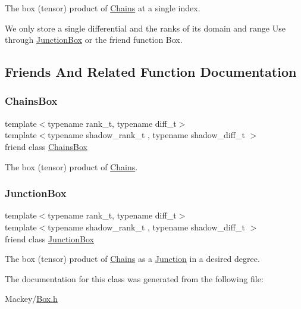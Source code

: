The box (tensor) product of \hyperlink{classMackey_1_1Chains}{Chains} at a single index. 

We only store a single differential and the ranks of its domain and range Use through \hyperlink{classMackey_1_1JunctionBox}{Junction\+Box} or the friend function Box. 

\subsection{Friends And Related Function Documentation}
\mbox{\label{classMackey_1_1BoxPoint_ac5da7907baad1a7469bb064b08228610}} 
\subsubsection{\texorpdfstring{Chains\+Box}{ChainsBox}}
{\footnotesize\ttfamily template$<$typename rank\+\_\+t, typename diff\+\_\+t$>$ \\
template$<$typename shadow\+\_\+rank\+\_\+t , typename shadow\+\_\+diff\+\_\+t $>$ \\
friend class \hyperlink{classMackey_1_1ChainsBox}{Chains\+Box}\hspace{0.3cm}{\ttfamily [friend]}}



The box (tensor) product of \hyperlink{classMackey_1_1Chains}{Chains}. 

\mbox{\label{classMackey_1_1BoxPoint_aa6b9506519f57502db8432843a492fd1}} 
\subsubsection{\texorpdfstring{Junction\+Box}{JunctionBox}}
{\footnotesize\ttfamily template$<$typename rank\+\_\+t, typename diff\+\_\+t$>$ \\
template$<$typename shadow\+\_\+rank\+\_\+t , typename shadow\+\_\+diff\+\_\+t $>$ \\
friend class \hyperlink{classMackey_1_1JunctionBox}{Junction\+Box}\hspace{0.3cm}{\ttfamily [friend]}}



The box (tensor) product of \hyperlink{classMackey_1_1Chains}{Chains} as a \hyperlink{classMackey_1_1Junction}{Junction} in a desired degree. 



The documentation for this class was generated from the following file\+:\begin{DoxyCompactItemize}
\item 
Mackey/\hyperlink{Box_8h}{Box.\+h}\end{DoxyCompactItemize}
